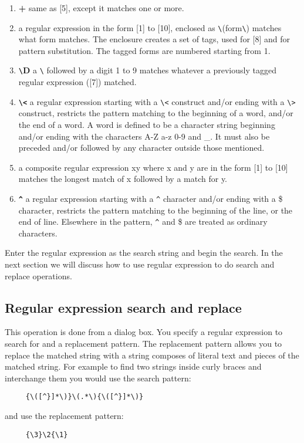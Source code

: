 \begin{enumerate}
\item {\bf +} same as [5], except it matches one or more.

\item a regular expression in the form [1] to [10], enclosed
                as \verb+\+(form\verb+\+) matches what form matches.
                The enclosure creates a set of tags, used for [8] and for
                pattern substitution. The tagged forms are numbered
		starting from 1.

\item {\bf \verb+\+D} a \verb+\+ followed by a digit 1 to 9 matches
		whatever a
                previously tagged regular expression ([7]) matched.

\item {\bf \verb+\+\verb+<+} a regular expression starting
		with a \verb+\+\verb+<+ construct and/or ending
		with a \verb+\+\verb+>+ construct, restricts the
		pattern matching to the beginning of a word, and/or
		the end of a word. A word is defined to be a character
		string beginning and/or ending with the characters
		A-Z a-z 0-9 and \_. It must also be preceded and/or
		followed by any character outside those mentioned.

\item a composite regular expression xy where x and y
                are in the form [1] to [10] matches the longest
                match of x followed by a match for y.

\item {\bf \verb+^+} a regular expression starting with a \verb+^+ character
		and/or ending with a \$ character, restricts the
                pattern matching to the beginning of the line,
                or the end of line.  Elsewhere in the
		pattern, \verb+^+ and \$ are treated as ordinary characters.

\end{enumerate}

Enter the regular expression as the search string and begin the search.
In the next section we will discuss how to use regular expression to do
search and replace operations.


\subsection{Regular expression search and replace}

This operation is done from a dialog box.
You specify a regular expression to search for and a replacement pattern.
The replacement pattern allows you to replace the matched string with
a string composes of literal text and pieces of the matched string.
For example to find two strings inside curly braces and interchange
them you would use the search pattern:
\begin{verbatim}
     {\([^}]*\)}\(.*\){\([^}]*\)}
\end{verbatim}
and use the replacement pattern:
\begin{verbatim}
     {\3}\2{\1}
\end{verbatim}

